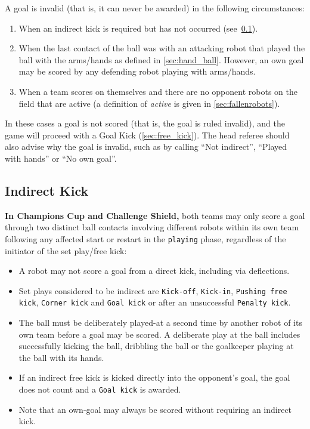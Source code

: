 A goal is invalid (that is, it can never be awarded) in the following circumstances:
\begin{enumerate}
    \item When an indirect kick is required but has not occurred (see~\cref{sec:indirect_kick_default}).
    \item When the last contact of the ball was with an attacking robot that played the ball with the arms/hands as defined in \cref{sec:hand_ball}.
      However, an own goal may be scored by any defending robot playing with arms/hands.
    \item When a team scores on themselves and there are no opponent robots on the field that are active (a definition of \emph{active} is given in \cref{sec:fallenrobots}).
\end{enumerate}

In these cases a goal is not scored (that is, the goal is ruled invalid), and the game will proceed with a Goal Kick (\cf \cref{sec:free_kick}).
The head referee should also advise why the goal is invalid, such as by calling ``Not indirect'', ``Played with hands'' or ``No own goal''.

\subsection{Indirect Kick}
\label{sec:indirect_kick_default}

\textbf{In Champions Cup and Challenge Shield,} both teams may only score a goal through two distinct ball contacts involving different robots within its own team following any affected start or restart in the \texttt{playing} phase, regardless of the initiator of the set play/free kick:

\begin{itemize}
  \item A robot may not score a goal from a direct kick, including via deflections.
  \item Set plays considered to be indirect are \texttt{Kick-off}, \texttt{Kick-in}, \texttt{Pushing free kick}, \texttt{Corner kick} and \texttt{Goal kick} or after an unsuccessful \texttt{Penalty kick}.
  \item The ball must be deliberately played-at a second time by another robot of its own team before a goal may be scored.
    A deliberate play at the ball includes successfully kicking the ball, dribbling the ball or the goalkeeper playing at the ball with its hands.
  \item If an indirect free kick is kicked directly into the opponent's goal, the goal does not count and a \texttt{Goal kick} is awarded.
  \item Note that an own-goal may always be scored without requiring an indirect kick.
\end{itemize}

